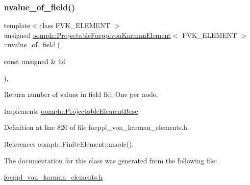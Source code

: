 \subsubsection{\texorpdfstring{nvalue\+\_\+of\+\_\+field()}{nvalue\_of\_field()}}
{\footnotesize\ttfamily template$<$class F\+V\+K\+\_\+\+E\+L\+E\+M\+E\+NT $>$ \\
unsigned \hyperlink{classoomph_1_1ProjectableFoepplvonKarmanElement}{oomph\+::\+Projectable\+Foepplvon\+Karman\+Element}$<$ F\+V\+K\+\_\+\+E\+L\+E\+M\+E\+NT $>$\+::nvalue\+\_\+of\+\_\+field (\begin{DoxyParamCaption}\item[{const unsigned \&}]{fld }\end{DoxyParamCaption})\hspace{0.3cm}{\ttfamily [inline]}, {\ttfamily [virtual]}}



Return number of values in field fld\+: One per node. 



Implements \hyperlink{classoomph_1_1ProjectableElementBase_a1a9a6de16f3511bca8e8be770abb9c2e}{oomph\+::\+Projectable\+Element\+Base}.



Definition at line 826 of file foeppl\+\_\+von\+\_\+karman\+\_\+elements.\+h.



References oomph\+::\+Finite\+Element\+::nnode().



The documentation for this class was generated from the following file\+:\begin{DoxyCompactItemize}
\item 
\hyperlink{foeppl__von__karman__elements_8h}{foeppl\+\_\+von\+\_\+karman\+\_\+elements.\+h}\end{DoxyCompactItemize}
